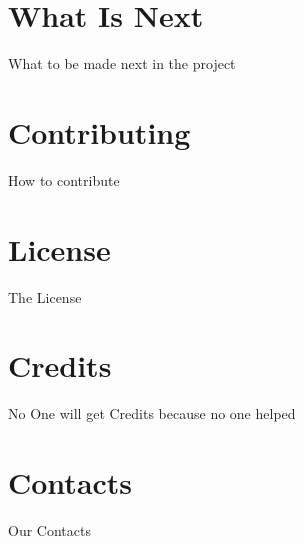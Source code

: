 \section{What Is Next}
    What to be made next in the project

\section{Contributing}
    How to contribute

\section{License}
    The License

\section{Credits}
    No One will get Credits because no one helped

\section{Contacts}
    Our Contacts